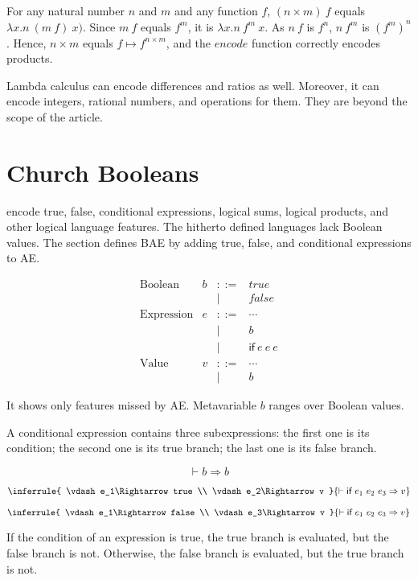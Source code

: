 For any natural number \(n\) and \(m\) and any function \(f\), \( (n\times m)\
f\) equals \(\lambda x.n\ (m\ f)\ x)\). Since \(m\ f\) equals \(f^m\), it is
\(\lambda x.n\ f^m\ x\). As \(n\ f\) is \(f^n\), \(n\ f^m\) is \( (f^m )^n\).
Hence, \(n\times m\) equals \(f\mapsto f^{n\times m}\), and the
\(\mathit{encode}\) function correctly encodes products.

Lambda calculus can encode differences and ratios as well. Moreover, it can
encode integers, rational numbers, and operations for them. They are beyond the
scope of the article.

\section{Church Booleans}

 encode true, false, conditional expressions, logical sums,
logical products, and other logical language features. The hitherto defined
languages lack Boolean values. The section defines BAE by adding true, false, and
conditional expressions to AE.

\[
\begin{array}{lrcl}
\text{Boolean} & b & ::= & true \\
&& | & false \\
\text{Expression} & e & ::= & \cdots \\
&& | & b \\
&& | & \textsf{if}\ e\ e\ e \\
\text{Value} & v & ::= & \cdots \\
&& | & b
\end{array}
\]

It shows only features missed by AE. Metavariable \(b\) ranges over Boolean
values.

A conditional expression contains three subexpressions: the first one is its
condition; the second one is its true branch; the last one is its false branch.

\[
\vdash b\Rightarrow b
\]

\[
\inferrule
{ \vdash e_1\Rightarrow true \\ \vdash e_2\Rightarrow v }
{ \vdash \textsf{if}\ e_1\ e_2\ e_3\Rightarrow v}
\]

\[
\inferrule
{ \vdash e_1\Rightarrow false \\ \vdash e_3\Rightarrow v }
{ \vdash \textsf{if}\ e_1\ e_2\ e_3\Rightarrow v}
\]

If the condition of an expression is true, the true branch is evaluated, but the
false branch is not. Otherwise, the false branch is evaluated, but the true
branch is not.

